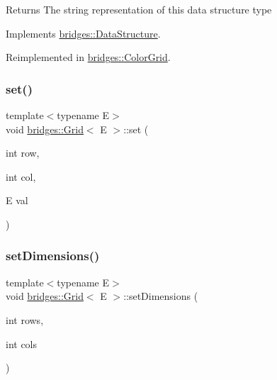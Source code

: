\begin{DoxyReturn}{Returns}
The string representation of this data structure type 
\end{DoxyReturn}


Implements \mbox{\hyperlink{classbridges_1_1_data_structure_a957a63b106e340bc753620c650632bdc}{bridges\+::\+Data\+Structure}}.



Reimplemented in \mbox{\hyperlink{classbridges_1_1_color_grid_a6bb93994dade8e79a197459532dad153}{bridges\+::\+Color\+Grid}}.

\mbox{\label{classbridges_1_1_grid_acd750e5886349488257aba85f0b06f6f}} 
\subsubsection{\texorpdfstring{set()}{set()}}
{\footnotesize\ttfamily template$<$typename E$>$ \\
void \mbox{\hyperlink{classbridges_1_1_grid}{bridges\+::\+Grid}}$<$ E $>$\+::set (\begin{DoxyParamCaption}\item[{int}]{row,  }\item[{int}]{col,  }\item[{E}]{val }\end{DoxyParamCaption})\hspace{0.3cm}{\ttfamily [inline]}}

\mbox{\label{classbridges_1_1_grid_a8e5e4d92097f9d1481a14219eb5cc5a8}} 
\subsubsection{\texorpdfstring{set\+Dimensions()}{setDimensions()}}
{\footnotesize\ttfamily template$<$typename E$>$ \\
void \mbox{\hyperlink{classbridges_1_1_grid}{bridges\+::\+Grid}}$<$ E $>$\+::set\+Dimensions (\begin{DoxyParamCaption}\item[{int}]{rows,  }\item[{int}]{cols }\end{DoxyParamCaption})\hspace{0.3cm}{\ttfamily [inline]}}



